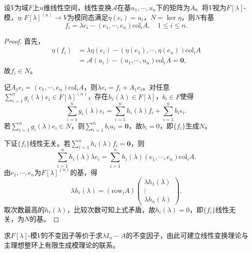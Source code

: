 \documentclass[../../main.tex]{subfiles}%
\begin{document}
\begin{theorem}
设$V$为域$F$上$n$维线性空间，线性变换$\mathscr{A}$在基$u_1,\cdots,u_n$下的矩阵为$A$。将$V$视为$F[\lambda]$-模，$\eta\colon F[\lambda]^{(n)}\to V$为模同态满足$\eta(e_i)=u_i$，$N=\ker\eta$，则$N$有基
$$f_i=\lambda e_i-(e_1,\cdots,e_n)\mathrm{col}_iA,\quad 1\leqslant i\leqslant n.$$
\end{theorem}

\begin{proof}

首先，
\begin{align*}
\eta(f_i)&=\lambda\eta(e_i)-(\eta(e_1),\cdots,\eta(e_n))\mathrm{col}_iA\\
&=\mathscr{A}(u_i)-(u_1,\cdots,u_n)\mathrm{col}_iA=\boldsymbol{0},
\end{align*}
故$f_i\in N$。

记$A_1e_i=(e_1,\cdots,e_n)\mathrm{col}_iA$，则$\lambda e_i=f_i+A_1e_i$。对任意$\sum_{i=1}^ng_i(\lambda)e_i\in F[\lambda]^{(n)}$，存在$h_i(\lambda)\in F[\lambda]$，$b_i\in F$使得
$$\sum_{i=1}^ng_i(\lambda)e_i=\sum_{i=1}^nh_i(\lambda)f_i+\sum_{i=1}^nb_ie_i.$$
若$\sum_{i=1}^ng_i(\lambda)e_i\in N$，则$\sum_{i=1}^nb_iu_i=\boldsymbol{0}$，故$b_i=0$，即$\{f_i\}$生成$N$。

下证$\{f_i\}$线性无关。若$\sum_{i=1}^nh_i(\lambda)f_i=\boldsymbol{0}$，则
$$\sum_{i=1}^nh_i(\lambda)\lambda e_i=\sum_{i=1}^nh_i(\lambda)(e_1,\cdots,e_n)\mathrm{col}_iA.$$
由$e_1,\cdots,e_n$为$F[\lambda]^{(n)}$的基，得
$$\lambda h_i(\lambda)=(\mathrm{row}_iA)\begin{pmatrix}\lambda h_1(\lambda)\\\vdots\\\lambda h_n(\lambda)\end{pmatrix}.$$
取次数最高的$h_r(\lambda)$，比较次数可知上式矛盾，故$h_i(\lambda)=0$，即$\{f_i\}$线性无关，为$N$的基。

\end{proof}

\begin{remark}
求$F[\lambda]$-模$V$的不变因子等价于求$\lambda I_n-A$的不变因子，由此可建立线性变换理论与主理想整环上有限生成模理论的联系。
\end{remark}
\end{document}
